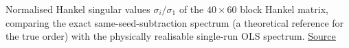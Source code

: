 Normalised Hankel singular values $\sigma_i / \sigma_1$ of the $40 \times 60$ block Hankel matrix, comparing the exact same-seed-subtraction spectrum (a theoretical reference for the true order) with the physically realisable single-run OLS spectrum. \href{https://github.com/tahmidazam/gg4/blob/main/notebooks/latent_dim/latent_dim.ipynb}{\underline{Source}}%